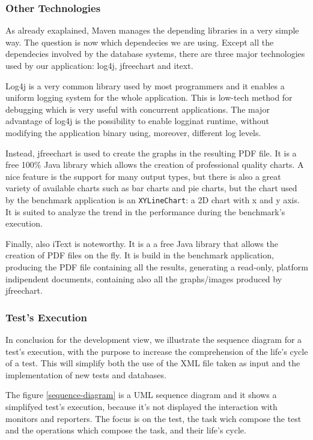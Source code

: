 			\subsubsection{Other Technologies}

As already exaplained, Maven manages the depending libraries in a very simple way. The question is now which dependecies we are using. Except all the dependecies involved by the database systems, there are three major technologies used by our application: log4j, jfreechart and itext.

Log4j is a very common library used by most programmers and it enables a uniform logging system for the whole application. This is low-tech method for debugging which is very useful with concurrent applications. The major advantage of log4j is the possibility to enable logginat runtime, without modifying the application binary using, moreover, different log levels.

Instead, jfreechart is used to create the graphs in the resulting PDF file. It is a free 100\% Java library which allows the creation of professional quality charts. A nice feature is the support for many output types, but there is also a great variety of available charts such as bar charts and pie charts, but the chart used by the benchmark application is an \lstinline!XYLineChart!: a 2D chart with x and y axis. It is suited to analyze the trend in the performance during the benchmark's execution.

Finally, also iText is noteworthy. It is a a free Java library that allows the creation of PDF files on the fly. It is build in the benchmark application, producing the PDF file containing all the results, generating a read-only, platform indipendent documents, containing also all the graphs/images produced by jfreechart.
			
			\subsubsection{Test's Execution}

In conclusion for the development view, we illustrate the sequence diagram for a test's execution, with the purpose to increase the comprehension of the life's cycle of a test. This will simplify both the use of the XML file taken as input and the implementation of new tests and databases. 

The figure \ref{sequence-diagram} is a UML sequence diagram and it shows a simplifyed test's execution, because it's not displayed the interaction with monitors and reporters. The focus is on the test, the task wich compose the test and the operations which compose the task, and their life's cycle.
		

